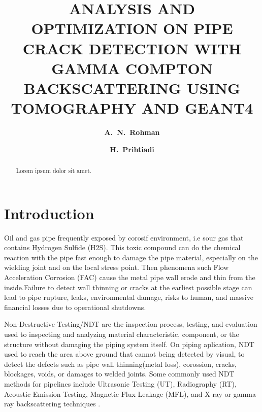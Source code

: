 \documentclass[aps,prd,twocolumn,superscriptaddress,nofootinbib,amsmath,amssymb]{revtex4-2}
\begin{document}
\title{\textbf{ANALYSIS AND OPTIMIZATION ON PIPE CRACK DETECTION WITH GAMMA COMPTON BACKSCATTERING USING TOMOGRAPHY AND GEANT4}}

\author{\textbf{A.~N.~Rohman}}
\author{\textbf{H.~Prihtiadi}}

\begin{abstract}
Lorem ipsum dolor sit amet.
\end{abstract}

\maketitle

\section{Introduction}
Oil and gas pipe frequently exposed by corosif environment, i.e sour gas that contains Hydrogen Sulfide (H2S)\cite{Parishan2026}. This toxic compound can do the chemical reaction with the pipe fast enough to damage the pipe material, especially on the wielding joint and on the local stress point\cite{Parishan2026}. Then phenomena such Flow Acceleration Corrosion (FAC) cause the metal pipe wall erode and thin from the inside\cite{Elhoushy2018}.Failure to detect wall thinning or cracks at the earliest possible stage can lead to pipe rupture, leaks, environmental damage, risks to human, and massive financial losses due to operational shutdowns\cite{Wong2021}.  

Non-Destructive Testing/NDT are the inspection process, testing, and evaluation used to inspecting and analyzing material characteristic, component, or the structure without damaging the piping system itself\cite{Sari2019,Tai2025}. On piping aplication, NDT used to reach the area above ground that cannot being detected by visual, to detect the defects such as pipe wall thinning(metal loss), corossion, cracks, blockages, voids, or damages to welded joints\cite{Li2024}. Some commonly used NDT methods for pipelines include Ultrasonic Testing (UT), Radiography (RT), Acoustic Emission Testing, Magnetic Flux Leakage (MFL), and X-ray or gamma-ray backscattering techniques \cite{Sari2017}.
\end{document}
